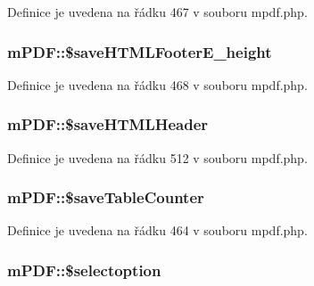 Definice je uvedena na řádku 467 v souboru mpdf.\-php.

\hypertarget{classm_p_d_f_a156184db8adebaee82ccdf09ff2f89e2}{
\subsubsection[{\$save\-H\-T\-M\-L\-Footer\-E\-\_\-height}]{\setlength{\rightskip}{0pt plus 5cm}m\-P\-D\-F\-::\$save\-H\-T\-M\-L\-Footer\-E\-\_\-height}}\label{classm_p_d_f_a156184db8adebaee82ccdf09ff2f89e2}


Definice je uvedena na řádku 468 v souboru mpdf.\-php.

\hypertarget{classm_p_d_f_a676a62f59341d6bcf742bec055738023}{
\subsubsection[{\$save\-H\-T\-M\-L\-Header}]{\setlength{\rightskip}{0pt plus 5cm}m\-P\-D\-F\-::\$save\-H\-T\-M\-L\-Header}}\label{classm_p_d_f_a676a62f59341d6bcf742bec055738023}


Definice je uvedena na řádku 512 v souboru mpdf.\-php.

\hypertarget{classm_p_d_f_aba4237f6ef9519abbac42d6f066827a5}{
\subsubsection[{\$save\-Table\-Counter}]{\setlength{\rightskip}{0pt plus 5cm}m\-P\-D\-F\-::\$save\-Table\-Counter}}\label{classm_p_d_f_aba4237f6ef9519abbac42d6f066827a5}


Definice je uvedena na řádku 464 v souboru mpdf.\-php.

\hypertarget{classm_p_d_f_aedf7ce15145835671cc8936cd3a893ed}{
\subsubsection[{\$selectoption}]{\setlength{\rightskip}{0pt plus 5cm}m\-P\-D\-F\-::\$selectoption}}\label{classm_p_d_f_aedf7ce15145835671cc8936cd3a893ed}


